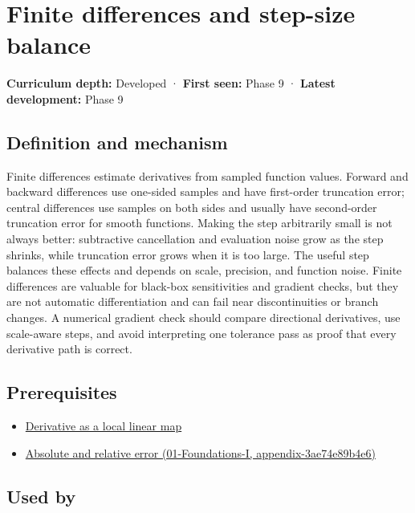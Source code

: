 \hypertarget{appendix-e2d7b4f2161d}{}
\section{Finite differences and step-size balance}\label{appendix-e2d7b4f2161d-finite-differences-and-step-size-balance}

\textbf{Curriculum depth:} Developed · \textbf{First seen:} Phase 9 · \textbf{Latest development:} Phase 9

\subsection{Definition and mechanism}\label{appendix-e2d7b4f2161d-definition-and-mechanism}

Finite differences estimate derivatives from sampled function values. Forward and backward differences use one-sided samples and have first-order truncation error; central differences use samples on both sides and usually have second-order truncation error for smooth functions. Making the step arbitrarily small is not always better: subtractive cancellation and evaluation noise grow as the step shrinks, while truncation error grows when it is too large. The useful step balances these effects and depends on scale, precision, and function noise. Finite differences are valuable for black-box sensitivities and gradient checks, but they are not automatic differentiation and can fail near discontinuities or branch changes. A numerical gradient check should compare directional derivatives, use scale-aware steps, and avoid interpreting one tolerance pass as proof that every derivative path is correct.

\subsection{Prerequisites}\label{appendix-e2d7b4f2161d-prerequisites}

\begin{itemize}
\tightlist
\item
  \hyperref[appendix-7bc181935c42]{Derivative as a local linear map}
\item
  \href{../01-Foundations-I/main.pdf\#nameddest=appendix-3ae74e89b4e6}{Absolute and relative error (01-Foundations-I, appendix-3ae74e89b4e6)}
\end{itemize}

\subsection{Used by}\label{appendix-e2d7b4f2161d-used-by}

